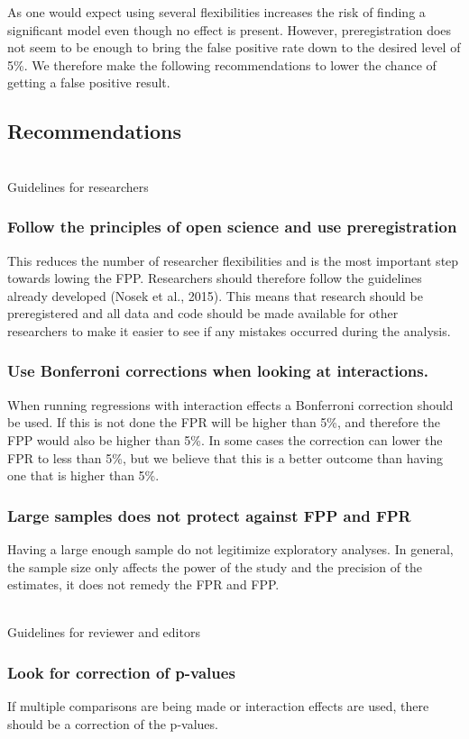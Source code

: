 As one would expect using several flexibilities increases the risk of finding a significant model even though no effect is present. However, preregistration does not seem to be enough to bring the false positive rate down to the desired level of 5\%. We therefore make the following recommendations to lower the chance of getting a false positive result. 

\subsection{Recommendations}
\hfill\\
Guidelines for researchers 
\hfill\\
\subsubsection{Follow the principles of open science and use preregistration}
This reduces the number of researcher flexibilities and is the most important step towards lowing the FPP. Researchers should therefore follow the guidelines already developed (Nosek et al., 2015). This means that research should be preregistered and all data and code should be made available for other researchers to make it easier to see if any mistakes occurred during the analysis. 
\subsubsection{Use Bonferroni corrections when looking at interactions.}
When running regressions with interaction effects a Bonferroni correction should be used. If this is not done the FPR will be higher than 5\%, and therefore the FPP would also be higher than 5\%. In some cases the correction can lower the FPR to less than 5\%, but we believe that this is a better outcome than having one that is higher than 5\%. 
\subsubsection{Large samples does not protect against FPP and FPR}
Having a large enough sample do not legitimize exploratory analyses. In general, the sample size only affects the power of the study and the precision of the estimates, it does not remedy the FPR and FPP. 

\hfill\\
Guidelines for reviewer and editors
\hfill\\
\subsubsection{Look for correction of p-values}
If multiple comparisons are being made or interaction effects are used, there should be a correction of the p-values.
